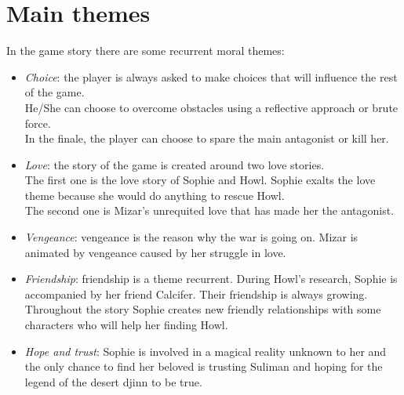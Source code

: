 \section{Main themes}

In the game story there are some recurrent moral themes:

\begin{itemize}
\item \textit{Choice}: the player is always asked to make choices that will influence the rest of the game. \\
  He/She can choose to overcome obstacles using a reflective approach or brute force. \\
  In the finale, the player can choose to spare the main antagonist or kill her.

\item \textit{Love}: the story of the game is created around two love stories. \\
  The first one is the love story of Sophie and Howl. Sophie exalts the love theme because she would do anything to rescue Howl. \\
  The second one is Mizar’s unrequited love that has made her the antagonist.

\item \textit{Vengeance}: vengeance is the reason why the war is going on. Mizar is animated by vengeance caused by her struggle in love.


\item \textit{Friendship}: friendship is a theme recurrent. During Howl's research, Sophie is accompanied by her friend Calcifer. Their friendship is always growing. Throughout the story Sophie creates new friendly relationships with some characters who will help her finding Howl.

\item \textit{Hope and trust}: Sophie is involved in a magical reality unknown to her and the only chance to find her beloved is trusting Suliman and hoping for the legend of the desert djinn  to be true.

\end{itemize}
